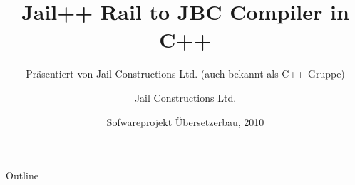 \documentclass[ucs,9pt]{beamer}
\title[Jail++] %
{\textbf{Jail++} \newline Rail to JBC Compiler in C++}
\subtitle
{Pr\"asentiert von Jail Constructions Ltd. (auch bekannt als C++ Gruppe)}
\author[Jail Constructions Ltd.] %
{Jail Constructions Ltd.}
\institute[FU Berlin] %
{Freie Universität Berlin}
\date[CFP 2003] %
{Sofwareprojekt \"Ubersetzerbau, 2010}
\begin{document}
\begin{frame}[plain]
  \titlepage
\end{frame}

\begin{frame}{Outline}
  \tableofcontents
\end{frame}






\end{document}
